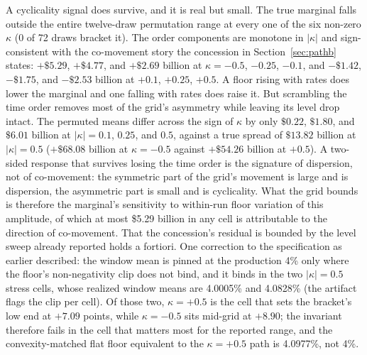 \documentclass[12pt]{article}
\begin{document}
A cyclicality signal does survive, and it is real but small. The true marginal falls outside the entire twelve-draw permutation range at every one of the six non-zero $\kappa$ (0 of 72 draws bracket it). The order components are monotone in $|\kappa|$ and sign-consistent with the co-movement story the concession in Section~\ref{sec:pathb} states: $+\$5.29$, $+\$4.77$, and $+\$2.69$ billion at $\kappa = -0.5$, $-0.25$, $-0.1$, and $-\$1.42$, $-\$1.75$, and $-\$2.53$ billion at $+0.1$, $+0.25$, $+0.5$. A floor rising with rates does lower the marginal and one falling with rates does raise it. But scrambling the time order removes most of the grid's asymmetry while leaving its level drop intact. The permuted means differ across the sign of $\kappa$ by only $\$0.22$, $\$1.80$, and $\$6.01$ billion at $|\kappa| = 0.1$, $0.25$, and $0.5$, against a true spread of $\$13.82$ billion at $|\kappa| = 0.5$ ($+\$68.08$ billion at $\kappa = -0.5$ against $+\$54.26$ billion at $+0.5$). A two-sided response that survives losing the time order is the signature of dispersion, not of co-movement: the symmetric part of the grid's movement is large and is dispersion, the asymmetric part is small and is cyclicality. What the grid bounds is therefore the marginal's sensitivity to within-run floor variation of this amplitude, of which at most \$5.29 billion in any cell is attributable to the direction of co-movement. That the concession's residual is bounded by the level sweep already reported holds a fortiori. One correction to the specification as earlier described: the window mean is pinned at the production 4\% only where the floor's non-negativity clip does not bind, and it binds in the two $|\kappa| = 0.5$ stress cells, whose realized window means are 4.0005\% and 4.0828\% (the artifact flags the clip per cell). Of those two, $\kappa = +0.5$ is the cell that sets the bracket's low end at $+7.09$ points, while $\kappa = -0.5$ sits mid-grid at $+8.90$; the invariant therefore fails in the cell that matters most for the reported range, and the convexity-matched flat floor equivalent to the $\kappa = +0.5$ path is 4.0977\%, not 4\%.
\end{document}
